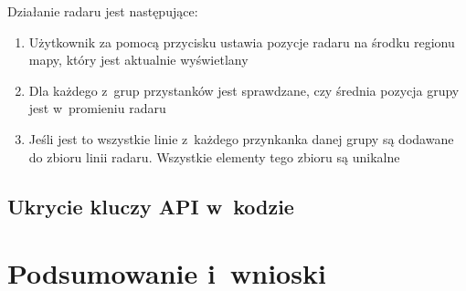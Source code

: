 \documentclass{SGGW-thesis}
\begin{document}
Działanie radaru jest następujące:
\begin{enumerate}
  \item{Użytkownik za pomocą przycisku ustawia pozycje radaru na środku regionu mapy, który jest aktualnie wyświetlany}
  \item{Dla każdego z~grup przystanków jest sprawdzane, czy średnia pozycja grupy jest w~promieniu radaru}
  \item{Jeśli jest to wszystkie linie z~każdego przynkanka danej grupy są dodawane do zbioru linii radaru. Wszystkie elementy tego zbioru są unikalne}
\end{enumerate}
\section{Ukrycie kluczy API w~kodzie}



\chapter{Podsumowanie i~wnioski}


\begin{thebibliography}{9}

\end{thebibliography}

\beforelastpage
\end{document}
